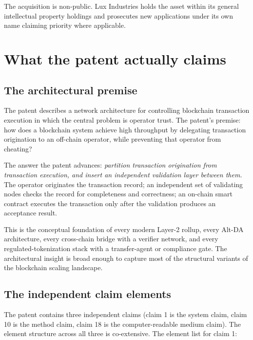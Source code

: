 \documentclass[11pt,letterpaper]{article}
\begin{document}
The acquisition is non-public. Lux Industries holds the asset within its general intellectual property holdings and prosecutes new applications under its own name claiming priority where applicable.

\section{What the patent actually claims}

\subsection{The architectural premise}

The patent describes a network architecture for controlling blockchain transaction execution in which the central problem is operator trust. The patent's premise: how does a blockchain system achieve high throughput by delegating transaction origination to an off-chain operator, while preventing that operator from cheating?

The answer the patent advances: \emph{partition transaction origination from transaction execution, and insert an independent validation layer between them.} The operator originates the transaction record; an independent set of validating nodes checks the record for completeness and correctness; an on-chain smart contract executes the transaction only after the validation produces an acceptance result.

This is the conceptual foundation of every modern Layer-2 rollup, every Alt-DA architecture, every cross-chain bridge with a verifier network, and every regulated-tokenization stack with a transfer-agent or compliance gate. The architectural insight is broad enough to capture most of the structural variants of the blockchain scaling landscape.

\subsection{The independent claim elements}

The patent contains three independent claims (claim 1 is the system claim, claim 10 is the method claim, claim 18 is the computer-readable medium claim). The element structure across all three is co-extensive. The element list for claim 1:
\end{document}
